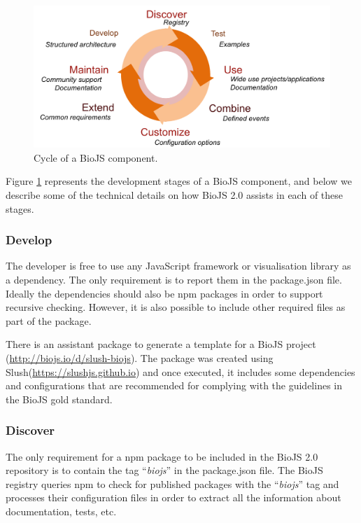 \begin{figure}  
\centering
\includegraphics[width=\textwidth]{figures/biojs_cycle.png}
\caption[Cycle of a BioJS component]{Cycle of a BioJS component.
\label{fig:biojs_cycle}}
\end{figure}

Figure \ref{fig:biojs_cycle} represents the development stages of  a BioJS component, and below we describe some of the technical details on how BioJS 2.0 assists in each of these stages.

\subsubsection{Develop}
The developer is free to use any JavaScript framework or visualisation library as a dependency. The only requirement is to report them in the package.json file. Ideally the dependencies should also be npm packages in order to support recursive checking. However, it is also possible to include other required files as part of the package. 

There is an assistant package to generate a template for a BioJS project (\url{http://biojs.io/d/slush-biojs}). The package was created using Slush(\url{https://slushjs.github.io}) and once executed, it includes some dependencies and configurations that are recommended for complying with the guidelines in the BioJS gold standard.

\subsubsection{Discover}
The only requirement for a npm package to be included in the BioJS 2.0 repository is to contain the tag ``\emph{biojs}'' in the package.json file. The BioJS registry queries npm to check for published packages with the ``\emph{biojs}'' tag and processes their configuration files in order to extract all the information about documentation, tests, etc.

